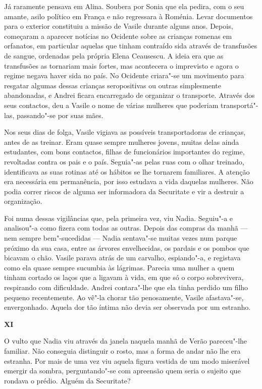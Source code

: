Já raramente pensava em Alina. Soubera por Sonia que ela pedira, com o
seu amante, asilo político em França e não regressara à Roménia. Levar
documentos para o exterior constituiu a missão de Vasile durante alguns
anos. Depois, começaram a aparecer notícias no Ocidente sobre as
crianças romenas em orfanatos, em particular aquelas
que tinham contraído sida através de transfusões de sangue, ordenadas
pela própria Elena Ceausescu. A ideia era que as transfusões as
tornariam mais fortes, mas acontecera o imprevisto e agora o regime
negava haver sida no país. No Ocidente criara"-se um movimento para
resgatar algumas dessas crianças seropositivas ou outras simplesmente
abandonadas, e Andrei ficara encarregado de organizar o transporte.
Através dos seus contactos, deu a Vasile o nome de várias mulheres que
poderiam transportá"-las, passando"-se por suas mães.

Nos seus dias de folga, Vasile vigiava as possíveis transportadoras de
crianças, antes de as treinar. Eram quase sempre mulheres jovens, muitas
delas ainda estudantes, com bons contactos, filhas de funcionários importantes do regime, revoltadas contra os pais e o país. Seguia"-as pelas
ruas com o olhar treinado, identificava as suas rotinas até os hábitos
se lhe tornarem familiares. A atenção era necessária em permanência, por
isso estudava a vida daquelas mulheres. Não podia correr riscos de
alguma ser informadora da Securitate e vir a destruir a organização.

Foi numa dessas vigilâncias que, pela primeira vez, viu Nadia. Seguiu"-a
e analisou"-a como fizera com todas as outras. Depois das compras da
manhã --- nem sempre bem"-sucedidas --- Nadia sentava"-se muitas vezes num parque próximo da sua
casa, entre as árvores envelhecidas, os pardais e os pombos que bicavam
o chão. Vasile parava atrás de um carvalho, espiando"-a, e registava como
ela quase sempre sucumbia às lágrimas. Parecia uma mulher a quem tinham
cortado os laços que a ligavam à vida,
em que só o corpo sobrevivera, respirando com dificuldade. Andrei
contara"-lhe que ela tinha perdido um filho pequeno recentemente. Ao
vê"-la chorar tão penosamente, Vasile afastava"-se, envergonhado. Aquela
dor tão íntima não devia ser observada por um estranho.


\pagebreak
\thispagestyle{empty}
\movetooddpage
\vspace*{1.8cm}
\noindent{}\textbf{XI}

\bigskip

O vulto que Nadia viu através da janela naquela manhã de Verão
pareceu"-lhe familiar. Não conseguia distinguir o rosto, mas a forma de
andar não lhe era estranha. Por mais de uma vez viu aquela figura
vestida de um modo miserável emergir da sombra, perguntando"-se com
apreensão quem seria o sujeito que rondava o prédio. Alguém da
Securitate?

